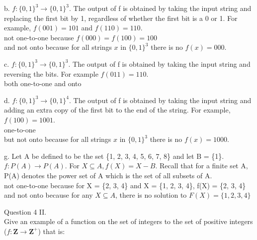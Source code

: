 \documentclass[OPONE]{example}
\begin{document}
\begin{list}{}{}
	
	\item{b.}
	$f: \{0, 1\}^{3}\rightarrow\{0, 1\}^{3}.$ The output of f is obtained by taking the input string and replacing the first bit by 1, regardless of whether the first bit is a 0 or 1. For example, $f(001) = 101$ and $f(110) = 110$.\\
	not one-to-one because $f(000) = f(100) = 100$ \\
	and not onto because for all strings $x$ in $\{0, 1\}^{3}$ there is no $f(x) = 000$.
	
	\item{c.}
	$f:\{0, 1\}^{3}\rightarrow\{0, 1\}^{3}$. The output of f is obtained by taking the input string and reversing the bits. For example $f(011) = 110$.	 \\
	both one-to-one and onto
	
	\item{d.}
	$f: \{0, 1\}^{3}\rightarrow\{0, 1\}^{4}$. The output of f is obtained by taking the input string and adding an extra copy of the first bit to the end of the string. For example,$ f(100) = 1001$. \\
	one-to-one \\
	but not onto because for all strings $x$ in $\{0, 1\}^{3}$ there is no $f(x) = 1000$.
	
	\item{g.}
	Let A be defined to be the set \{1, 2, 3, 4, 5, 6, 7, 8\} and let B = \{1\}. $f: P(A) \rightarrow P(A)$. For $X \subseteq A, f(X) = X - B.$ Recall that for a finite set A, P(A) denotes the power set of A which is the set of all subsets of A. \\
	not one-to-one because for X = \{2, 3, 4\} and X = \{1, 2, 3, 4\}, f(X) = \{2, 3, 4\} \\
	and not onto because for any $X \subseteq A$, there is no solution to $F(X) = \{1, 2, 3, 4\}$
	
\end{list}

\noindent Question 4 II. \\

\noindent Give an example of a function on the set of integers to the set of positive integers  ($f: \textbf{Z} \rightarrow \textbf{Z}^{+}$) that is: 
\end{document}
